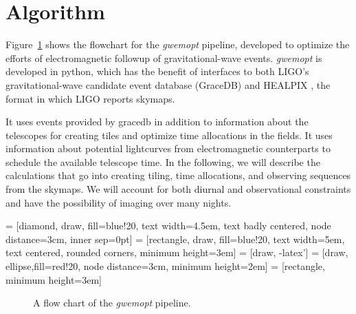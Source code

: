 \documentclass[twocolumn]{aastex61}
\begin{document}
\section{Algorithm}
\label{sec:algorithm}

Figure~\ref{fig:flowchart} shows the flowchart for the \emph{gwemopt} pipeline, developed to optimize the efforts of electromagnetic followup of gravitational-wave events. \emph{gwemopt} is developed in python, which has the benefit of interfaces to both LIGO's gravitational-wave candidate event database (GraceDB) and HEALPIX \citep{GoHi2005}, the format in which LIGO reports skymaps.

It uses events provided by gracedb in addition to information about the telescopes for creating tiles and optimize time allocations in the fields.
It uses information about potential lightcurves from electromagnetic counterparts to schedule the available telescope time.
In the following, we will describe the calculations that go into creating tiling, time allocations, and observing sequences from the skymaps.
We will account for both diurnal and observational constraints and have the possibility of imaging over many nights.

 = [diamond, draw, fill=blue!20,
    text width=4.5em, text badly centered, node distance=3cm, inner sep=0pt]
 = [rectangle, draw, fill=blue!20,
    text width=5em, text centered, rounded corners, minimum height=3em]
 = [draw, -latex']
 = [draw, ellipse,fill=red!20, node distance=3cm,
    minimum height=2em]
 = [rectangle, minimum height=3em]

\begin{figure}[t]
 \begin{center}
 \end{center}
 \caption{A flow chart of the \emph{gwemopt} pipeline.}
 \label{fig:flowchart}
\end{figure}
\end{document}
